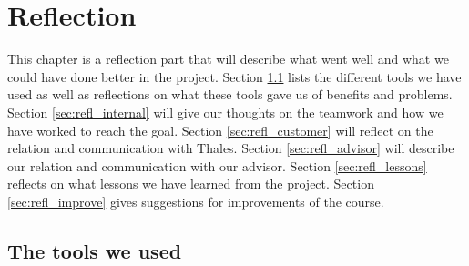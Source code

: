 

\chapter{Reflection}

This chapter is a reflection part that will describe what went well and what we could have done better in the project. Section \ref{sec:refl_tools} lists the different tools we have used as well as reflections on what these tools gave us of benefits and problems. Section \ref{sec:refl_internal} will give our thoughts on the teamwork and how we have worked to reach the goal. Section \ref{sec:refl_customer} will reflect on the relation and communication with Thales. Section \ref{sec:refl_advisor} will describe our relation and communication with our advisor. Section \ref{sec:refl_lessons} reflects on what lessons we have learned from the project. Section \ref{sec:refl_improve} gives suggestions for improvements of the course.

\section{The tools we used}\label{sec:refl_tools}

